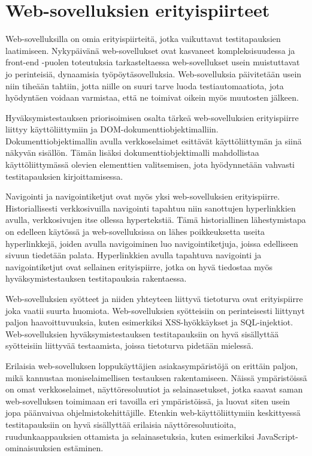 \section{Web-sovelluksien erityispiirteet} \label{ch:08_websovelluksien_erityispiirteet}

  Web-sovelluksilla on omia erityispiirteitä, jotka vaikuttavat testitapauksien laatimiseen.
  Nykypäivänä web-sovellukset ovat kasvaneet kompleksisuudessa ja front-end -puolen toteutuksia tarkasteltaessa web-sovellukset usein muistuttavat jo perinteisiä, dynaamisia työpöytäsovelluksia.
  Web-sovelluksia päivitetään usein niin tiheään tahtiin, jotta niille on suuri tarve luoda testiautomaatiota, jota hyödyntäen voidaan varmistaa, että ne toimivat oikein myös muutosten jälkeen.

  Hyväksymistestauksen priorisoimisen osalta tärkeä web-sovelluksien erityispiirre liittyy käyttöliittymiin ja DOM-dokumenttiobjektimalliin.
  Dokumenttiobjektimallin avulla verkkoselaimet esittävät käyttöliittymän ja siinä näkyvän sisällön.
  Tämän lisäksi dokumenttiobjektimalli mahdollistaa käyttöliittymässä olevien elementtien valitsemisen, jota hyödynnetään vahvasti testitapauksien kirjoittamisessa.

  Navigointi ja navigointiketjut ovat myös yksi web-sovelluksien erityispiirre.
  Historiallisesti verkkosivuilla navigointi tapahtuu niin sanottujen hyperlinkkien avulla, verkkosivujen itse ollessa hypertekstiä.
  Tämä historiallinen lähestymistapa on edelleen käytössä ja web-sovelluksissa on lähes poikkeuksetta useita hyperlinkkejä, joiden avulla navigoiminen luo navigointiketjuja, joissa edelliseen sivuun tiedetään palata.
  Hyperlinkkien avulla tapahtuva navigointi ja navigointiketjut ovat sellainen erityispiirre, jotka on hyvä tiedostaa myös hyväksymistestauksen testitapauksia rakentaessa.

  Web-sovelluksien syötteet ja niiden yhteyteen liittyvä tietoturva ovat erityispiirre joka vaatii suurta huomiota.
  Web-sovelluksien syötteisiin on perinteisesti liittynyt paljon haavoittuvuuksia, kuten esimerkiksi XSS-hyökkäykset ja SQL-injektiot.
  Web-sovelluksien hyväksymistestauksen testitapauksiin on hyvä sisällyttää syötteisiin liittyvää testaamista, joissa tietoturva pidetään mielessä.

  Erilaisia web-sovelluksen loppukäyttäjien asiakasympäristöjä on erittäin paljon, mikä kannustaa moniselaimellisen testauksen rakentamiseen.
  Näissä ympäristöissä on omat verkkoselaimet, näyttöresoluutiot ja selainasetukset, jotka saavat saman web-sovelluksen toimimaan eri tavoilla eri ympäristöissä, ja luovat siten usein jopa päänvaivaa ohjelmistokehittäjille.
  Etenkin web-käyttöliittymiin keskittyessä testitapauksiin on hyvä sisällyttää erilaisia näyttöresoluutioita, ruudunkaappauksien ottamista ja selainasetuksia, kuten esimerkiksi JavaScript-ominaisuuksien estäminen.

